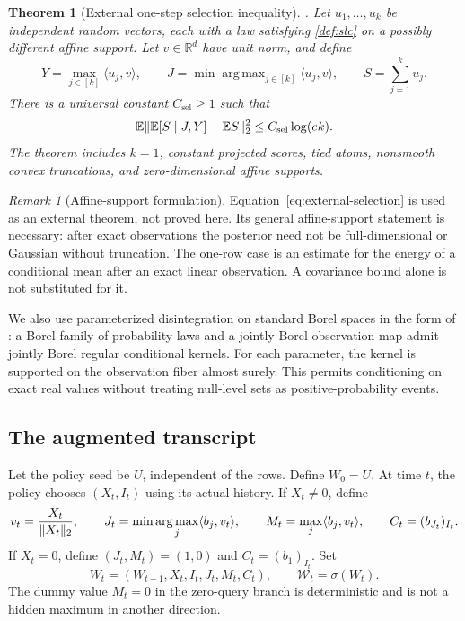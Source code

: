 \documentclass[11pt]{article}
\numberwithin{equation}{section}
\newtheorem{theorem}{Theorem}[section]
\theoremstyle{definition}
\theoremstyle{remark}
\newtheorem{remark}[remark]{Remark}
\newcommand{\R}{\mathbb R}
\newcommand{\E}{\mathbb E}
\newcommand{\cW}{\mathcal W}
\newcommand{\Csel}{C_{\mathrm{sel}}}
\DeclareMathOperator{\argmax}{arg\,max}
\DeclarePairedDelimiter{\norm}{\lVert}{\rVert}
\newcommand{\ip}[2]{\langle #1,#2\rangle}
\begin{document}
\begin{theorem}[External one-step selection inequality]\label{thm:external-selection}
\cite[Theorem~14]{ZZQL2026}.
Let $u_1,\ldots,u_k$ be independent random vectors, each with a law satisfying \cref{def:slc} on a possibly different affine support. Let $v\in\R^d$ have unit norm, and define
\[
Y=\max_{j\in[k]}\ip{u_j}{v},\qquad
J=\min\argmax_{j\in[k]}\ip{u_j}{v},\qquad S=\sum_{j=1}^k u_j.
\]
There is a universal constant $\Csel\ge1$ such that
\begin{equation}\label{eq:external-selection}
\E\norm{\E[S\mid J,Y]-\E S}_2^2\le\Csel\log(ek).
\end{equation}
The theorem includes $k=1$, constant projected scores, tied atoms, nonsmooth convex truncations, and zero-dimensional affine supports.
\end{theorem}

\begin{remark}[Affine-support formulation]
Equation~\eqref{eq:external-selection} is used as an external theorem, not proved here. Its general affine-support statement is necessary: after exact observations the posterior need not be full-dimensional or Gaussian without truncation. The one-row case is an estimate for the energy of a conditional mean after an exact linear observation. A covariance bound alone is not substituted for it.
\end{remark}

We also use parameterized disintegration on standard Borel spaces in the form of \cite[Lemma~10]{ZZQL2026}: a Borel family of probability laws and a jointly Borel observation map admit jointly Borel regular conditional kernels. For each parameter, the kernel is supported on the observation fiber almost surely. This permits conditioning on exact real values without treating null-level sets as positive-probability events.

\subsection{The augmented transcript}

Let the policy seed be $U$, independent of the rows. Define $W_0=U$. At time $t$, the policy chooses $(X_t,I_t)$ using its actual history. If $X_t\ne0$, define
\begin{equation}\label{eq:augmented-observation}
v_t=\frac{X_t}{\norm{X_t}_2},\qquad
J_t=\min\argmax_j\ip{b_j}{v_t},\qquad
M_t=\max_j\ip{b_j}{v_t},\qquad
C_t=(b_{J_t})_{I_t}.
\end{equation}
If $X_t=0$, define $(J_t,M_t)=(1,0)$ and $C_t=(b_1)_{I_t}$. Set
\begin{equation}\label{eq:W}
W_t=(W_{t-1},X_t,I_t,J_t,M_t,C_t),\qquad \cW_t=\sigma(W_t).
\end{equation}
The dummy value $M_t=0$ in the zero-query branch is deterministic and is not a hidden maximum in another direction.
\end{document}
